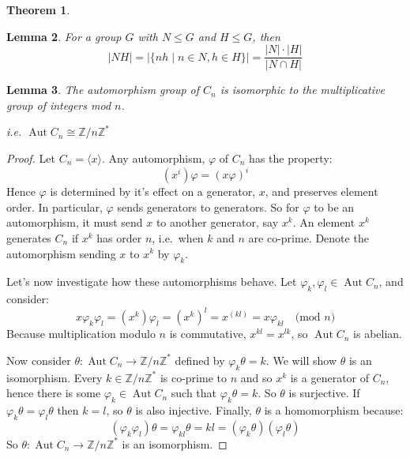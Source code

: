 \documentclass[a4paper, oneside, 12pt, final]{article}
\newtheorem{theorem}{Theorem}[section]
\newtheorem{lemma}[theorem]{Lemma}
\theoremstyle{definition}
\DeclareMathOperator{\Aut}{Aut}
\newcommand{\Z}{\mathbb{Z}}
\newcommand{\Zn}[1]{\Z/#1\Z}
\begin{document}
\begin{theorem}\label{thm:iso3}
\end{theorem}

\begin{lemma}\label{lem:setprodorder}
    For a group \(G\) with \(N \leqslant G\) and \(H \leqslant G\), then
    \[|NH| = |\{nh \mid n \in N, h \in H\}| = \frac{|N| \cdot |H|}{|N \cap H|}\]
\end{lemma}

\begin{lemma}\label{lem:aut}
    The automorphism group of \(C_n\) is isomorphic to the multiplicative group
    of integers mod \(n\).

    i.e. \(\Aut{C_n} \cong \Zn{n}^*\)
\end{lemma}

\begin{proof}
    Let \(C_n = \langle x \rangle\).
    Any automorphism, \(\varphi\) of \(C_n\) has the property:
    \[(x^i)\varphi = {(x\varphi)}^i\]
    Hence \(\varphi\) is determined by it's effect on a generator, \(x\), and preserves element
    order.
    In particular, \(\varphi\) sends generators to generators.
    So for \(\varphi\) to be an automorphism, it must send \(x\) to another generator, say \(x^k\).
    An element \(x^k\) generates \(C_n\) if \(x^k\) has order \(n\), i.e.\ when \(k\) and \(n\) are co-prime.
    Denote the automorphism sending \(x\) to \(x^k\) by \(\varphi_k\).

    Let's now investigate how these automorphisms behave.
    Let \(\varphi_k, \varphi_l \in \Aut{C_n}\), and consider:
    \[x\varphi_k\varphi_l = (x^k)\varphi_l = {(x^k)}^l = x^{(kl)} = x\varphi_{kl} \quad \text{(mod \(n\))}\]
    Because multiplication modulo \(n\) is commutative, \(x^{kl} = x^{lk}\), so \(\Aut{C_n}\) is abelian.

    Now consider \(\theta:\Aut{C_n} \to \Zn{n}^*\) defined by \(\varphi_k\theta = k\).
    We will show \(\theta\) is an isomorphism.
    Every \(k \in \Zn{n}^*\) is co-prime to \(n\) and so \(x^k\) is a generator of \(C_n\), hence there is some \(\varphi_k
    \in \Aut{C_n}\) such that \(\varphi_k\theta = k\).
    So \(\theta\) is surjective.
    If \(\varphi_k\theta = \varphi_l\theta\) then \(k = l\), so \(\theta\) is also injective.
    Finally, \(\theta\) is a homomorphism because:
    \[(\varphi_k\varphi_l)\theta = \varphi_{kl}\theta = kl = (\varphi_k\theta)(\varphi_l\theta)\]
    So \(\theta:\Aut{C_n} \to \Zn{n}^*\) is an isomorphism.
\end{proof}
\end{document}
